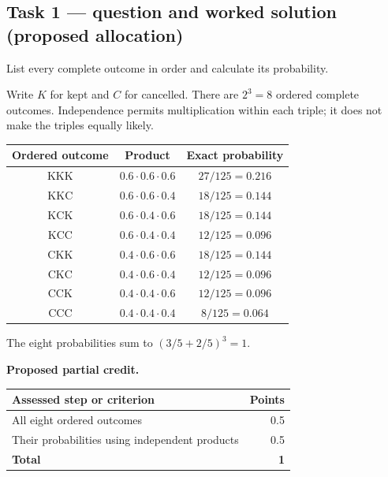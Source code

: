 \subsection*{Task 1 --- question and worked solution (proposed allocation) }
\label{sol:q1t1}

List every complete outcome in order and calculate its probability.

Write $K$ for kept and $C$ for cancelled. There are $2^3=8$ ordered complete outcomes. Independence permits multiplication within each triple; it does not make the triples equally likely.

\begin{center}
\begin{tabular}{ccc}\toprule
Ordered outcome & Product & Exact probability\\\midrule
$\mathrm{KKK}$ & $0.6\cdot0.6\cdot0.6$ & $27/125=0.216$\\
$\mathrm{KKC}$ & $0.6\cdot0.6\cdot0.4$ & $18/125=0.144$\\
$\mathrm{KCK}$ & $0.6\cdot0.4\cdot0.6$ & $18/125=0.144$\\
$\mathrm{KCC}$ & $0.6\cdot0.4\cdot0.4$ & $12/125=0.096$\\
$\mathrm{CKK}$ & $0.4\cdot0.6\cdot0.6$ & $18/125=0.144$\\
$\mathrm{CKC}$ & $0.4\cdot0.6\cdot0.4$ & $12/125=0.096$\\
$\mathrm{CCK}$ & $0.4\cdot0.4\cdot0.6$ & $12/125=0.096$\\
$\mathrm{CCC}$ & $0.4\cdot0.4\cdot0.4$ & $8/125=0.064$\\
\bottomrule\end{tabular}
\end{center}

The eight probabilities sum to $(3/5+2/5)^3=1$.

\par\smallskip
\noindent\begin{minipage}{\linewidth}
\textbf{Proposed partial credit.}\par\smallskip
\begin{tabularx}{\linewidth}{@{}>{\raggedright\arraybackslash}X r@{}}\toprule
\textbf{Assessed step or criterion} & \textbf{Points}\\\midrule
All eight ordered outcomes & 0.5\\
Their probabilities using independent products & 0.5\\
\midrule
\textbf{Total} & \textbf{1}\\
\bottomrule\end{tabularx}
\end{minipage}\par\smallskip

